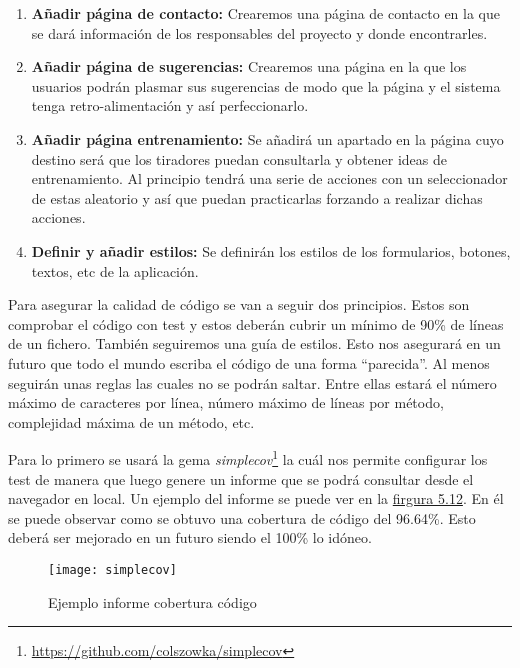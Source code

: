 \begin{enumerate}
  \item \textbf{Añadir página de contacto:} Crearemos una página de contacto en la que
    se dará información de los responsables del proyecto y donde encontrarles.

  \item \textbf{Añadir página de sugerencias:} Crearemos una página en la que los usuarios
    podrán plasmar sus sugerencias de modo que la página y el sistema tenga retro-alimentación
    y así perfeccionarlo.

  \item \textbf{Añadir página entrenamiento:} Se añadirá un apartado en la página cuyo destino
    será que los tiradores puedan consultarla y obtener ideas de entrenamiento. Al principio
    tendrá una serie de acciones con un seleccionador de estas aleatorio y así que puedan
    practicarlas forzando a realizar dichas acciones.

  \item \textbf{Definir y añadir estilos:} Se definirán los estilos de los formularios, botones,
    textos, etc de la aplicación.
\end{enumerate}

Para asegurar la calidad de código se van a seguir dos principios. Estos son comprobar
el código con test y estos deberán cubrir un mínimo de 90\% de líneas de un fichero.
También seguiremos una guía de estilos. Esto nos asegurará en un futuro que todo el mundo
escriba el código de una forma \enquote{parecida}. Al menos seguirán unas reglas las cuales
no se podrán saltar. Entre ellas estará el número máximo de caracteres por línea,
número máximo de líneas por método, complejidad máxima de un método, etc.

Para lo primero se usará la gema \textit{simplecov}\footnote{\url{https://github.com/colszowka/simplecov}} la cuál nos permite configurar
los test de manera que luego genere un informe que se podrá consultar desde el navegador
en local. Un ejemplo del informe se puede ver en la \hyperref[fig:Ejemplo informe cobertura código]{firgura 5.12}.
En él se puede observar como se obtuvo una cobertura de código del 96.64\%. Esto deberá ser
mejorado en un futuro siendo el 100\% lo idóneo.

\begin{figure}[htb]
  \centering
  \texttt{[image: simplecov]}
  \caption[Ejemplo informe cobertura código]{Ejemplo informe cobertura código}
  \label{fig:Ejemplo informe cobertura código}
\end{figure}

